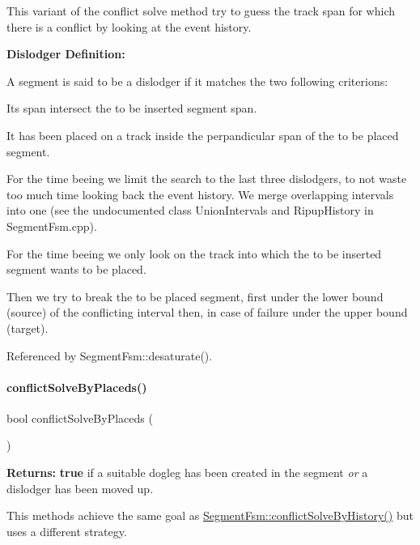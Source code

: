  This variant of the conflict solve method try to guess the track span for which there is a conflict by looking at the event history.

 {\bfseries Dislodger Definition\+:}

A segment is said to be a dislodger if it matches the two following criterions\+:
\begin{DoxyItemize}
\item It\textquotesingle{}s span intersect the to be inserted segment span.
\item It has been placed on a track inside the perpandicular span of the to be placed segment.
\end{DoxyItemize}

For the time beeing we limit the search to the last three dislodgers, to not waste too much time looking back the event history. We merge overlapping intervals into one (see the undocumented class {\ttfamily Union\+Intervals} and {\ttfamily Ripup\+History} in {\ttfamily Segment\+Fsm.\+cpp}).

For the time beeing we only look on the track into which the to be inserted segment wants to be placed.

Then we try to break the to be placed segment, first under the lower bound (source) of the conflicting interval then, in case of failure under the upper bound (target).

 

Referenced by Segment\+Fsm\+::desaturate().

\mbox{\label{classKite_1_1SegmentFsm_a9c0fa6a9067b6e027e24f38330f627dc}} 
\paragraph{\texorpdfstring{conflict\+Solve\+By\+Placeds()}{conflictSolveByPlaceds()}}
{\footnotesize\ttfamily bool conflict\+Solve\+By\+Placeds (\begin{DoxyParamCaption}{ }\end{DoxyParamCaption})}

{\bfseries Returns\+:} {\bfseries true} if a suitable dogleg has been created in the segment {\itshape or} a dislodger has been moved up.

This methods achieve the same goal as \hyperlink{classKite_1_1SegmentFsm_a0d9a9926ae67cc7998799347f135e28a}{Segment\+Fsm\+::conflict\+Solve\+By\+History()} but uses a different strategy.

